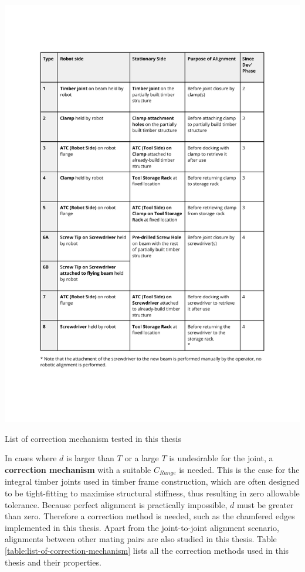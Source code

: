 \begin{table}[b]
    \includegraphics[page=5, trim=25.4mm 132mm 23.4mm 33mm, clip, width=\textwidth]{tables/Tables in Chapter 9 to 11.pdf}
    \caption{List of correction mechanism tested in this thesis}
    \label{table:list-of-correction-mechanism}
\end{table}

In cases where $d$ is larger than $T$ or a large $T$ is undesirable for the joint, a \textbf{correction mechanism} with a suitable $C_{Range}$ is needed. This is the case for the integral timber joints used in timber frame construction, which are often designed to be tight-fitting to maximise structural stiffness, thus resulting in zero allowable tolerance. Because perfect alignment is practically impossible, $d$ must be greater than zero. Therefore a correction method is needed, such as the chamfered edges implemented in this thesis. 
Apart from the joint-to-joint alignment scenario, alignments between other mating pairs are also studied in this thesis. Table \ref{table:list-of-correction-mechanism} lists all the correction methods used in this thesis and their properties.

